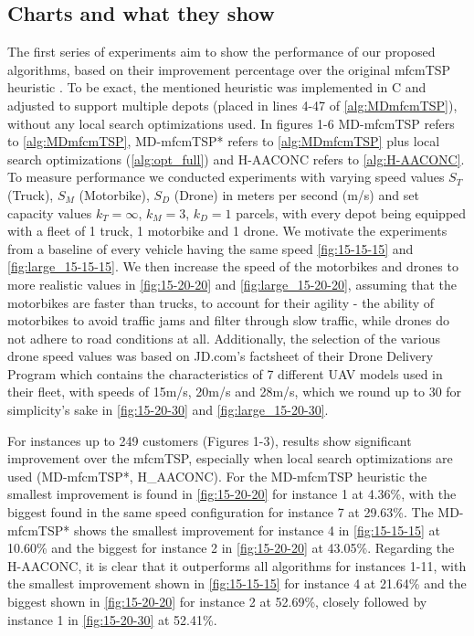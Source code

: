 \documentclass{article}
\begin{document}
	\subsection{Charts and what they show}
	The first series of experiments aim to show the performance of our proposed algorithms, based on their improvement percentage over the original mfcmTSP heuristic \cite{Oikonomou2021}. To be exact, the mentioned heuristic was implemented in C and adjusted to support multiple depots (placed in lines 4-47 of \autoref{alg:MDmfcmTSP}), without any local search optimizations used. In figures 1-6 MD-mfcmTSP refers to \autoref{alg:MDmfcmTSP}, MD-mfcmTSP* refers to \autoref{alg:MDmfcmTSP} plus local search optimizations (\autoref{alg:opt_full}) and H-AACONC refers to \autoref{alg:H-AACONC}. To measure performance we conducted experiments with varying speed values $S_T$ (Truck), $S_M$ (Motorbike), $S_D$ (Drone) in meters per second (m/s) and set capacity values $k_T=\infty$, $k_M=3$, $k_D=1$ parcels, with every depot being equipped with a fleet of 1 truck, 1 motorbike and 1 drone. We motivate the experiments from a baseline of every vehicle having the same speed \autoref{fig:15-15-15} and \autoref{fig:large_15-15-15}. 
	We then increase the speed of the motorbikes and drones to more realistic values in \autoref{fig:15-20-20} and \autoref{fig:large_15-20-20}, assuming that the motorbikes are faster than trucks, to account for their agility - the ability of motorbikes to avoid traffic jams and filter through slow traffic, while drones do not adhere to road conditions at all. Additionally, the selection of the various drone speed values was based on JD.com's factsheet of their Drone Delivery Program \autocite{JDcom} which contains the characteristics of 7 different UAV models used in their fleet, with speeds of 15m/s, 20m/s and 28m/s, which we round up to 30 for simplicity's sake in \autoref{fig:15-20-30} and \autoref{fig:large_15-20-30}.
	\par 
	For instances up to 249 customers (Figures 1-3), results show significant improvement over the mfcmTSP, especially when local search optimizations are used (MD-mfcmTSP*, H\_AACONC). For the MD-mfcmTSP heuristic the smallest improvement is found in \autoref{fig:15-20-20} for instance 1 at 4.36\%, with the biggest found in the same speed configuration for instance 7 at 29.63\%. The MD-mfcmTSP* shows the smallest improvement for instance 4 in \autoref{fig:15-15-15} at 10.60\% and the biggest for instance 2 in \autoref{fig:15-20-20} at 43.05\%. Regarding the H-AACONC, it is clear that it outperforms all algorithms for instances 1-11, with the smallest improvement shown in \autoref{fig:15-15-15} for instance 4 at 21.64\% and the biggest shown in \autoref{fig:15-20-20} for instance 2 at 52.69\%, closely followed by instance 1 in \autoref{fig:15-20-30} at 52.41\%.
\end{document}
